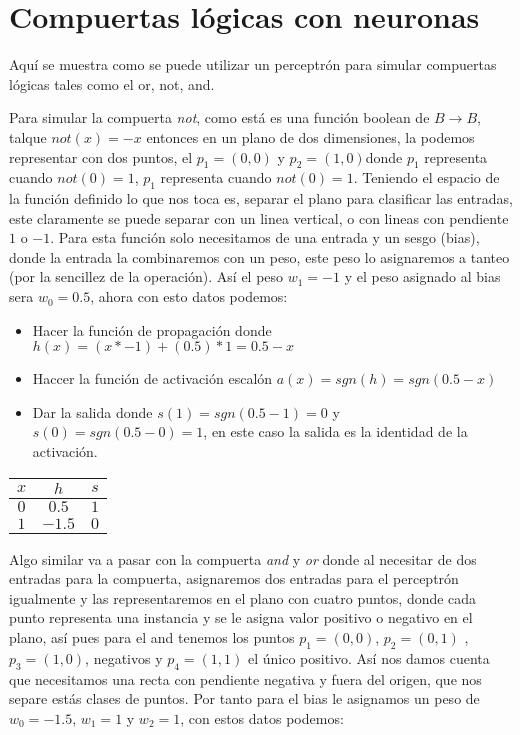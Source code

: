 \section{Compuertas lógicas con neuronas}

Aquí se muestra como se puede utilizar un perceptrón para simular compuertas lógicas tales como el or, not, and.

Para simular la compuerta \emph{not}, como está es una función boolean de \(B \rightarrow  B\), talque $not(x) = -x$ entonces en un plano de dos dimensiones, la podemos representar con dos puntos, el  $p_{1} = (0,0)$  y $p_{2} = (1,0)$donde $p_{1}$ representa cuando $not(0) = 1$, $p_{1}$ representa cuando $not(0) = 1$. Teniendo el espacio de la función definido lo que nos toca es, separar el plano para clasificar las entradas, este claramente se puede separar con un linea vertical, o con lineas con pendiente $1$ o $-1$. Para esta función solo necesitamos de una entrada y un sesgo (bias), donde la entrada la combinaremos con un peso, este peso lo asignaremos a tanteo (por la sencillez de la operación). Así el peso $w_{1} = -1$  y el peso asignado al bias sera $w_{0} = 0.5$, ahora con esto datos podemos:

\begin{itemize}
 \item Hacer la función de propagación donde $h(x) =  (x * -1) + (0.5) * 1 = 0.5 - x$
 \item Haccer la función de activación escalón $a(x) = sgn(h) = sgn(0.5-x)$ 
 \item Dar la salida donde $s(1) = sgn(0.5-1) = 0$ y $s(0) = sgn(0.5-0) =  1$, en este caso la salida es la identidad de la activación.
\end{itemize}

\begin{table}[H]
 \centering
\begin{tabular}{ | c | c |c | } 
 \hline
 $x$ &  $h$ & $s$ \\
 \hline
 $0$ &  $0.5$ & $1$ \\
 \hline
 $1$ &  $-1.5$ & $0$ \\
\hline
\end{tabular}
 
\end{table}


Algo similar va a pasar con la compuerta \emph{and} y \emph{or} donde al necesitar de dos entradas para la compuerta, asignaremos dos entradas para el perceptrón igualmente y las representaremos en el plano con cuatro puntos, donde cada punto representa una instancia y se le asigna valor positivo o negativo en el plano, así pues para el and tenemos los puntos $p_{1} = (0,0)$, $p_{2} = (0,1)$ , $p_{3} = (1,0)$, negativos y $p_{4} = (1,1)$ el único positivo. Así nos damos cuenta que necesitamos una recta con pendiente negativa y fuera del origen, que nos separe estás clases de puntos. Por tanto para el bias le asignamos un peso de $w_{0} = -1.5$, $w_{1} = 1$ y $w_{2} = 1$, con estos datos podemos: 


